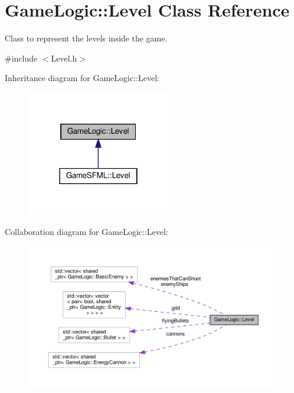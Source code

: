 \hypertarget{classGameLogic_1_1Level}{}\section{Game\+Logic\+:\+:Level Class Reference}
\label{classGameLogic_1_1Level}


Class to represent the levels inside the game.  




{\ttfamily \#include $<$Level.\+h$>$}



Inheritance diagram for Game\+Logic\+:\+:Level\+:\nopagebreak
\begin{figure}[H]
\begin{center}
\leavevmode
\includegraphics[width=178pt]{classGameLogic_1_1Level__inherit__graph}
\end{center}
\end{figure}


Collaboration diagram for Game\+Logic\+:\+:Level\+:\nopagebreak
\begin{figure}[H]
\begin{center}
\leavevmode
\includegraphics[width=350pt]{classGameLogic_1_1Level__coll__graph}
\end{center}
\end{figure}
